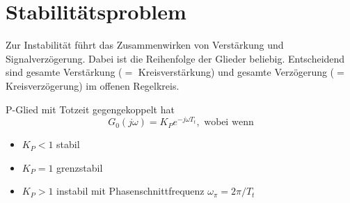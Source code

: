 \section{Stabilitätsproblem }
Zur Instabilität führt das Zusammenwirken von Verstärkung und Signalverzögerung. Dabei ist die Reihenfolge der Glieder beliebig. Entscheidend sind gesamte Verstärkung ($=$ Kreisverstärkung) und gesamte Verzögerung ($=$ Kreisverzögerung) im offenen Regelkreis.

\begin{figure}[h!]
	\centering
\end{figure}
P-Glied mit Totzeit gegengekoppelt hat 
\[
	G_0(j\omega) = K_P e^{-j\omega T_t}, \text{ wobei wenn}
\]
\begin{itemize}
	\item \(K_P < 1\) stabil
	\item \(K_P = 1\) grenzstabil
	\item \(K_P > 1\) instabil mit Phasenschnittfrequenz \(\omega_\pi = 2\pi/T_t\)
\end{itemize}

